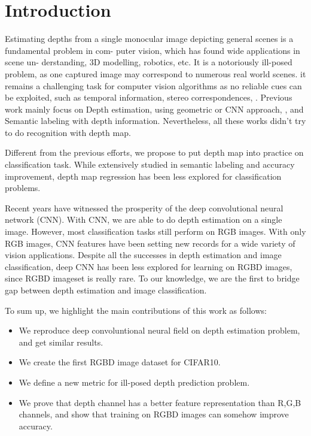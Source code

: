 \documentclass[10pt,twocolumn,letterpaper]{article}
\begin{document}
\section{Introduction}
Estimating depths from a single monocular image depicting 
general scenes is a fundamental problem in com- puter vision, 
which has found wide applications in scene un- derstanding, 
3D modelling, robotics, etc.
It is a notoriously ill-posed problem, 
as one captured image may correspond to numerous real world scenes\cite{eigen2014depth}. 
it remains a challenging task for computer vision algorithms as no reliable cues can be exploited,
such as temporal information, stereo correspondences, \etc.
Previous work mainly focus on Depth estimation,
using 
geometric\cite{hedau2010thinking,gupta2010estimating,gupta2010blocks} 
or CNN\cite{liu2015deep} approach,
, and Semantic labeling\cite{ladicky2014pulling} with depth information.
Nevertheless, all these works didn't try to do recognition with depth map.

Different from the previous efforts, 
we propose to put depth map into practice on classification task.
While extensively studied in semantic labeling and accuracy improvement,
depth map regression has been less explored for classification problems.

Recent years have witnessed the prosperity of the deep
convolutional neural network (CNN). 
With CNN, we are able to do depth estimation on a single image\cite{liu2015deep}.
However, most classification tasks still perform on RGB images.
With only RGB images, 
CNN features have been setting new records for a wide variety of vision applications\cite{razavian2014cnn}.
Despite all the successes in depth estimation and image classification,
deep CNN has been less explored for learning on RGBD images, since RGBD imageset is really rare.
To our knowledge, we are the first to bridge gap between depth estimation and 
image classification.

To sum up, we highlight the main contributions of this work as follows:
\begin{itemize}
\vspace{-.12cm} \item 
We reproduce deep convoluntional neural field on depth estimation problem, 
and get similar results.
\vspace{-.12cm} \item
We create the first RGBD image dataset for CIFAR10.
\vspace{-.12cm} \item 
We define a new metric for ill-posed depth prediction problem.
\vspace{-.12cm} \item 
We prove that depth channel has a better feature representation than R,G,B channels,
and show that training on RGBD images can somehow improve accuracy.
\end{itemize}
\end{document}
